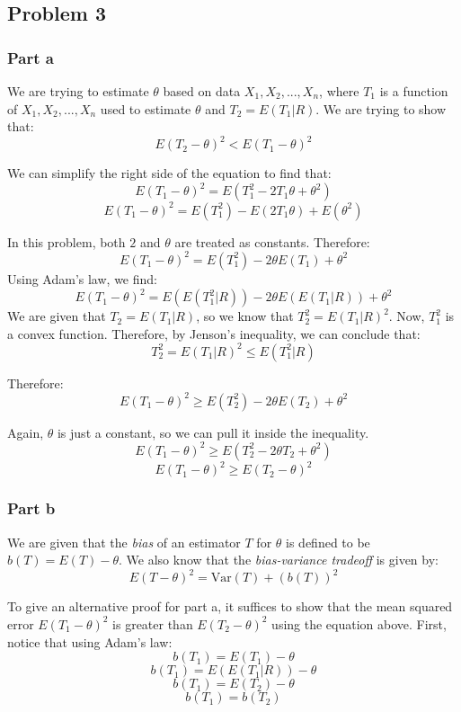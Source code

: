 \documentclass{article}
\begin{document}
\subsection{Problem 3}
\subsubsection{Part a}
We are trying to estimate $\theta$ based on data $X_{1}, X_{2}, ..., X_{n}$, where $T_{1}$ is a function of $X_{1}, X_{2}, ..., X_{n}$ used to estimate $\theta$ and $T_{2} = E(T_{1}|R)$. We are trying to show that:
$$E(T_{2} - \theta)^{2} < E(T_{1} - \theta)^{2}$$

We can simplify the right side of the equation to find that:
$$E(T_{1} - \theta)^{2} = E(T_{1}^{2} - 2T_{1}\theta + \theta^{2})$$
$$E(T_{1} - \theta)^{2} = E(T_{1}^{2}) - E(2T_{1}\theta) + E(\theta^{2})$$

In this problem, both $2$ and $\theta$ are treated as constants. Therefore:
$$E(T_{1} - \theta)^{2} = E(T_{1}^{2}) - 2\theta E(T_{1}) + \theta^{2}$$
Using Adam's law, we find:
$$E(T_{1} - \theta)^{2} = E(E(T_{1}^{2}|R)) - 2\theta E(E(T_{1}|R)) + \theta^{2}$$
We are given that $T_{2} = E(T_{1}|R)$, so we know that $T_{2}^{2} = E(T_{1}|R)^{2}$. Now, $T_{1}^2$ is a convex function. Therefore, by Jenson's inequality, we can conclude that:
$$T_{2}^{2} = E(T_{1}|R)^{2} \leq E(T_{1}^{2}|R)$$

Therefore:
$$E(T_{1} - \theta)^{2} \geq E(T_{2}^{2}) - 2\theta E(T_{2}) + \theta^{2}$$

Again, $\theta$ is just a constant, so we can pull it inside the inequality.
$$E(T_{1} - \theta)^{2} \geq E(T_{2}^{2} - 2\theta T_{2} + \theta^{2})$$
$$E(T_{1} - \theta)^{2} \geq E(T_{2} - \theta)^{2}$$


\subsubsection{Part b}
We are given that the \textit{bias} of an estimator $T$ for $\theta$ is defined to be $b(T) = E(T) - \theta$. We also know that the \textit{bias-variance tradeoff} is given by:
$$E(T - \theta)^{2} = \text{Var}(T) + (b(T))^{2}$$

To give an alternative proof for part a, it suffices to show that the mean squared error $E(T_{1} - \theta)^{2}$ is greater than $E(T_{2} - \theta)^{2}$ using the equation above. First, notice that using Adam's law:
$$b(T_{1}) = E(T_{1}) - \theta$$
$$b(T_{1}) = E(E(T_{1}|R)) - \theta$$
$$b(T_{1}) = E(T_{2}) - \theta$$
$$b(T_{1}) = b(T_{2})$$
\end{document}
